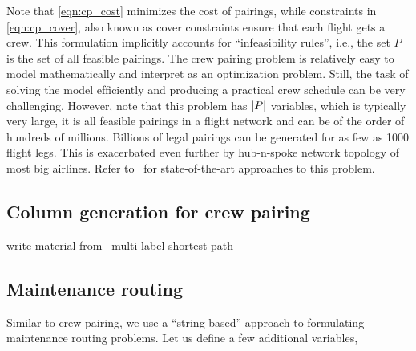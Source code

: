 \documentclass[letterpaper, 10pt, twocolumn, reqno]{amsart}
\begin{document}
Note that \eqref{eqn:cp_cost} minimizes the cost of pairings, while constraints in \eqref{eqn:cp_cover}, also known as cover constraints ensure that each flight gets a crew. This formulation implicitly accounts for ``infeasibility rules'', i.e., the set $P$ is the set of all feasible pairings.
The crew pairing problem is relatively easy to
model mathematically and interpret as an optimization problem. Still, the task of solving the model efﬁciently and producing a practical crew schedule can be very challenging. However, note that this problem has $\left| P \right|$ variables, which is typically very large, it is all feasible pairings in a flight network and can be of the order of hundreds of millions. Billions of legal pairings can be generated for as few as 1000 flight legs. This is exacerbated even further by hub-n-spoke network topology of most big airlines. Refer to~\cite{} for state-of-the-art approaches to this problem.

\subsection{Column generation for crew pairing}
\label{ssec:col_gen_cp}
write material from~\cite{gopalakrishnan2005airline}
multi-label shortest path


\subsection{Maintenance routing}
\label{ssec:maintenance_routing}

Similar to crew pairing, we use a ``string-based'' approach to formulating maintenance routing problems. Let us define a few additional variables,
\end{document}

